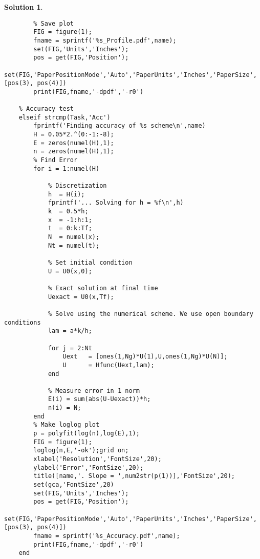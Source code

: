 \documentclass[10pt,letterpaper]{article}
\theoremstyle{break}
\newtheorem{mysolution}{Solution}
\newenvironment{solution}{\begin{mysolution}}{\end{mysolution}}
\begin{document}
\begin{solution}
\begin{lstlisting}
        % Save plot
        FIG = figure(1);
        fname = sprintf('%s_Profile.pdf',name);
        set(FIG,'Units','Inches');
        pos = get(FIG,'Position');
        set(FIG,'PaperPositionMode','Auto','PaperUnits','Inches','PaperSize',[pos(3), pos(4)])
        print(FIG,fname,'-dpdf','-r0')
        
    % Accuracy test
    elseif strcmp(Task,'Acc')
        fprintf('Finding accuracy of %s scheme\n',name)
        H = 0.05*2.^(0:-1:-8);
        E = zeros(numel(H),1);
        n = zeros(numel(H),1);
        % Find Error
        for i = 1:numel(H)
            
            % Discretization
            h  = H(i);
            fprintf('... Solving for h = %f\n',h)
            k  = 0.5*h;
            x  = -1:h:1;
            t  = 0:k:Tf;
            N  = numel(x);
            Nt = numel(t);
            
            % Set initial condition
            U = U0(x,0);
            
            % Exact solution at final time
            Uexact = U0(x,Tf);
            
            % Solve using the numerical scheme. We use open boundary conditions
            lam = a*k/h;
            
            for j = 2:Nt
                Uext   = [ones(1,Ng)*U(1),U,ones(1,Ng)*U(N)];
                U      = Hfunc(Uext,lam);
            end
            
            % Measure error in 1 norm
            E(i) = sum(abs(U-Uexact))*h;
            n(i) = N;
        end
        % Make loglog plot
        p = polyfit(log(n),log(E),1);
        FIG = figure(1);
        loglog(n,E,'-ok');grid on;
        xlabel('Resolution','FontSize',20);
        ylabel('Error','FontSize',20);
        title([name,'. Slope = ',num2str(p(1))],'FontSize',20);
        set(gca,'FontSize',20)
        set(FIG,'Units','Inches');
        pos = get(FIG,'Position');
        set(FIG,'PaperPositionMode','Auto','PaperUnits','Inches','PaperSize',[pos(3), pos(4)])
        fname = sprintf('%s_Accuracy.pdf',name);
        print(FIG,fname,'-dpdf','-r0')
    end
    \end{lstlisting}
    
\end{solution}
\end{document}
